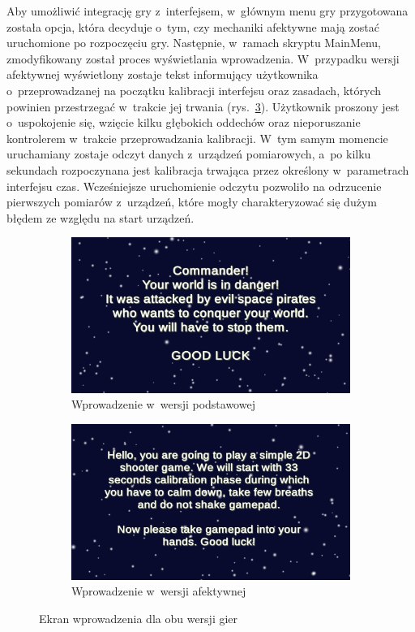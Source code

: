 Aby umożliwić integrację gry z~interfejsem, w~głównym menu gry przygotowana została opcja, która decyduje o~tym, czy mechaniki afektywne mają zostać uruchomione po rozpoczęciu gry. Następnie, w~ramach skryptu MainMenu, zmodyfikowany został proces wyświetlania wprowadzenia. W~przypadku wersji afektywnej wyświetlony zostaje tekst informujący użytkownika o~przeprowadzanej na początku kalibracji interfejsu oraz zasadach, których powinien przestrzegać w~trakcie jej trwania (rys.~\ref{fig:introductions}). Użytkownik proszony jest o~uspokojenie się, wzięcie kilku głębokich oddechów oraz nieporuszanie kontrolerem w~trakcie przeprowadzania kalibracji. W~tym samym momencie uruchamiany zostaje odczyt danych z~urządzeń pomiarowych, a~po kilku sekundach rozpoczynana jest kalibracja trwająca przez określony w~parametrach interfejsu czas. Wcześniejsze uruchomienie odczytu pozwoliło na odrzucenie pierwszych pomiarów z~urządzeń, które mogły charakteryzować się dużym błędem ze względu na start urządzeń.
\begin{figure}
	\begin{subfigure}{0.5\textwidth}
		\centering
		\includegraphics[width=0.9\linewidth]{images/nonaffectiveintroduction.png}
		\caption{Wprowadzenie w~wersji podstawowej}
		\label{fig:nonaffectiveintroduction}
	\end{subfigure}%
	\begin{subfigure}{0.5\textwidth}
		\centering
		\includegraphics[width=0.9\linewidth]{images/affectiveintroduction.png}
		\caption{Wprowadzenie w~wersji afektywnej}
		\label{fig:affectiveintroduction}
	\end{subfigure}
	\caption{Ekran wprowadzenia dla obu wersji gier}
	\label{fig:introductions}
\end{figure}

